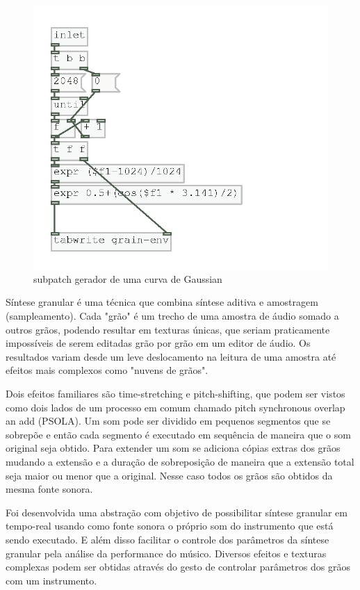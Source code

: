 \documentclass[draft]{ppgmus}
\begin{document}
\begin{figure}
\includegraphics[scale=.6]{granular3}
\caption{subpatch gerador de uma curva de Gaussian}
\label{granular3}
\end{figure}

Síntese granular é uma técnica que combina síntese aditiva e amostragem (sampleamento).
Cada "grão" é um trecho de uma amostra de áudio somado a outros grãos, podendo
resultar em texturas únicas, que seriam praticamente impossíveis de serem editadas
grão por grão em um editor de áudio. Os resultados variam desde um leve deslocamento na leitura
de uma amostra até efeitos mais complexos como "nuvens de grãos".

Dois efeitos familiares são time-stretching e pitch-shifting, que podem ser vistos
como dois lados de um processo em comum chamado pitch synchronous overlap an add (PSOLA).
Um som pode ser dividido em pequenos segmentos que se sobrepõe e então cada segmento
é executado em sequência de maneira que o som original seja obtido. Para extender um
som se adiciona cópias extras dos grãos mudando a extensão e a duração de sobreposição
de maneira que a extensão total seja maior ou menor que a original. Nesse caso todos os 
grãos são obtidos da mesma fonte sonora.

Foi desenvolvida uma abstração com objetivo de possibilitar síntese granular em tempo-real usando como
fonte sonora o próprio som do instrumento que está sendo executado. E além
disso facilitar o controle dos parâmetros da síntese granular pela análise
da performance do músico. Diversos efeitos e texturas complexas podem ser obtidas
através do gesto de controlar parâmetros dos grãos com um instrumento.
\end{document}
